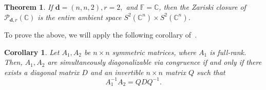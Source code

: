 \documentclass[a4paper]{cas-sc}
\newcommand{\dd}{\mathbf{d}}    %
\newcommand{\F}{\mathbb{F}}
\newtheorem{theorem}{Theorem}[section]
\newtheorem{corollary}{Corollary}[theorem]
\begin{document}
    \begin{theorem} \label{thm: zariski closure (n_n_2) over C filling}
        If $\dd=(n,n,2), r=2,$ and $\F=\mathbb{C}$, then the Zariski closure of $\mathcal{P}_{\dd,r}(\mathbb{C})$ is the entire ambient space $S^2(\mathbb{C}^n)\times S^2(\mathbb{C}^n)$.
    \end{theorem}
    To prove the above, we will apply the following corollary of~\citet[Theorem~7]{BUSTAMANTE20}.
        \begin{corollary} \label{lem: 2-tuple sdc}
            Let $A_1, A_2$ be $n \times n$ symmetric matrices, where $A_1$ is full-rank. Then, $A_1, A_2$ are simultaneously diagonalizable via congruence if and only if there exists a diagonal matrix $D$ and an invertible $n \times n$ matrix $Q$ such that
            $$A_1^{-1}A_2 = QDQ^{-1}.$$
        \end{corollary} 
    
\end{document}
